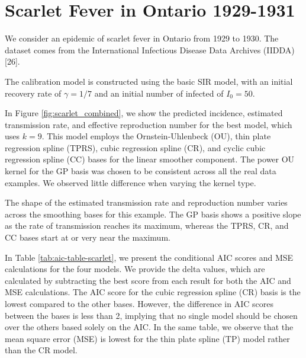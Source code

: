 \documentclass[
11pt, %
oneside, %
english, %
singlespacing, %
]{macthesis} %
\begin{document}
\section{Scarlet Fever in Ontario 1929-1931}\label{scarlet}

We consider an epidemic of scarlet fever in Ontario from 1929 to 1930. The dataset comes from the International Infectious Disease Data Archives (IIDDA) {[}26{]}.

The calibration model is constructed using the basic SIR model, with an initial recovery rate of \(\gamma = 1/7\) and an initial number of infected of \(I_0 = 50\).

In Figure \ref{fig:scarlet_combined}, we show the predicted incidence, estimated transmission rate, and effective reproduction number for the best model, which uses \(k = 9\). This model employs the Ornstein-Uhlenbeck (OU), thin plate regression spline (TPRS), cubic regression spline (CR), and cyclic cubic regression spline (CC) bases for the linear smoother component. The power OU kernel for the GP basis was chosen to be consistent across all the real data examples. We observed little difference when varying the kernel type.

The shape of the estimated transmission rate and reproduction number varies across the smoothing bases for this example. The GP basis shows a positive slope as the rate of transmission reaches its maximum, whereas the TPRS, CR, and CC bases start at or very near the maximum.

In Table \ref{tab:aic-table-scarlet}, we present the conditional AIC scores and MSE calculations for the four models. We provide the delta values, which are calculated by subtracting the best score from each result for both the AIC and MSE calculations. The AIC score for the cubic regression spline (CR) basis is the lowest compared to the other bases. However, the difference in AIC scores between the bases is less than 2, implying that no single model should be chosen over the others based solely on the AIC. In the same table, we observe that the mean square error (MSE) is lowest for the thin plate spline (TP) model rather than the CR model.
\end{document}
